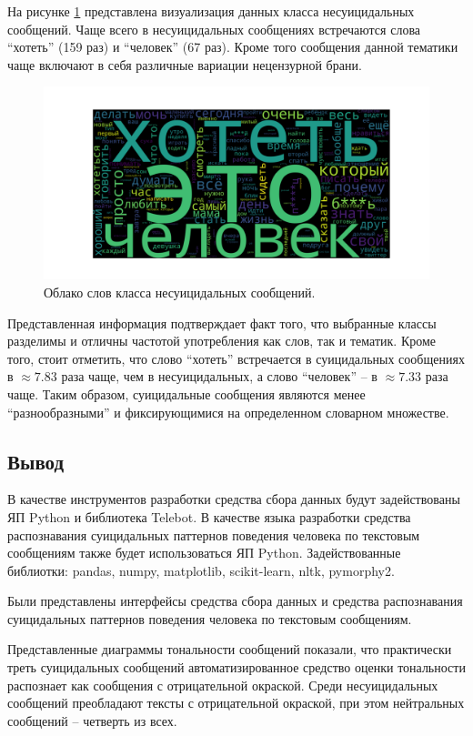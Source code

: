 На рисунке \ref{img:cloud2} представлена визуализация данных класса несуицидальных сообщений. Чаще всего в несуицидальных сообщениях встречаются слова ``хотеть'' (159 раз) и ``человек'' (67 раз). Кроме того сообщения данной тематики чаще включают в себя различные вариации нецензурной брани.

\begin{figure}[H]
	\centering
	\includegraphics[width=\textwidth]{inc/cloudNonSuicidal.pdf}
	\caption{ Облако слов класса несуицидальных сообщений. }
	\label{img:cloud2}
\end{figure}

Представленная информация подтверждает факт того, что выбранные классы разделимы и отличны частотой употребления как слов, так и тематик. Кроме того, стоит отметить, что слово ``хотеть'' встречается в суицидальных сообщениях в $\approx 7.83$ раза чаще, чем в несуицидальных, а слово ``человек'' -- в $\approx 7.33$ раза чаще. Таким образом, суицидальные сообщения являются менее ``разнообразными'' и фиксирующимися на определенном словарном множестве.

\subsection*{Вывод}

В качестве инструментов разработки средства сбора данных будут задействованы ЯП Python и библиотека Telebot. 
В качестве языка разработки средства распознавания суицидальных паттернов поведения человека по текстовым сообщениям также будет использоваться ЯП Python. 
Задействованные библиотки: pandas, numpy, matplotlib, scikit-learn, nltk, pymorphy2.

Были представлены интерфейсы средства сбора данных и средства распознавания суицидальных паттернов поведения человека по текстовым сообщениям.

Представленные диаграммы тональности сообщений показали, что практически треть суицидальных сообщений автоматизированное средство оценки тональности распознает как сообщения с отрицательной окраской. 
Среди несуицидальных сообщений преобладают тексты с отрицательной окраской, при этом нейтральных сообщений -- четверть из всех.

